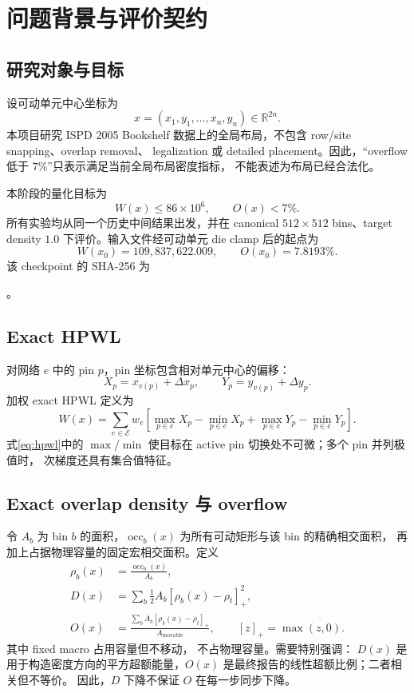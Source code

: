 \documentclass[UTF8,a4paper,11pt]{ctexart}
\DeclareRobustCommand{\code}[1]{\texttt{\detokenize{#1}}}
\newcommand{\R}{\mathbb{R}}
\newcommand{\pos}[1]{\left[#1\right]_{+}}
\begin{document}
\tableofcontents

\section{问题背景与评价契约}

\subsection{研究对象与目标}

设可动单元中心坐标为
\[
  x=(x_1,y_1,\ldots,x_n,y_n)\in\R^{2n}.
\]
本项目研究 ISPD 2005 Bookshelf 数据上的全局布局，不包含 row/site snapping、overlap removal、
legalization 或 detailed placement。因此，“overflow 低于 $7\%$”只表示满足当前全局布局密度指标，
不能表述为布局已经合法化。

本阶段的量化目标为
\[
  W(x)\le 86\times 10^6,
  \qquad O(x)<7\%.
\]
所有实验均从同一个历史中间结果出发，并在 canonical $512\times512$ bins、target density $1.0$
下评价。输入文件经可动单元 die clamp 后的起点为
\[
  W(x_0)=109{,}837{,}622.009,
  \qquad O(x_0)=7.8193\%.
\]
该 checkpoint 的 SHA-256 为
\par\noindent{}。

\subsection{Exact HPWL}

对网络 $e$ 中的 pin $p$，pin 坐标包含相对单元中心的偏移：
\[
  X_p=x_{v(p)}+\Delta x_p,
  \qquad
  Y_p=y_{v(p)}+\Delta y_p.
\]
加权 exact HPWL 定义为
\begin{equation}
  W(x)=\sum_{e\in\mathcal E}w_e
  \left[
  \max_{p\in e}X_p-\min_{p\in e}X_p
  +\max_{p\in e}Y_p-\min_{p\in e}Y_p
  \right].
  \label{eq:hpwl}
\end{equation}
式\eqref{eq:hpwl}中的 $\max/\min$ 使目标在 active pin 切换处不可微；多个 pin 并列极值时，
次梯度还具有集合值特征。

\subsection{Exact overlap density 与 overflow}

令 $A_b$ 为 bin $b$ 的面积，$\operatorname{occ}_b(x)$ 为所有可动矩形与该 bin 的精确相交面积，
再加上占据物理容量的固定宏相交面积。定义
\begin{align}
  \rho_b(x)&=\frac{\operatorname{occ}_b(x)}{A_b},\\
  D(x)&=\sum_b\frac{1}{2}A_b\pos{\rho_b(x)-\rho_t}^{2},
  \label{eq:density-energy}\\
  O(x)&=\frac{\sum_b A_b\pos{\rho_b(x)-\rho_t}}
  {A_{\mathrm{movable}}},
  \qquad \pos{z}=\max(z,0).
  \label{eq:overflow}
\end{align}
其中 fixed macro 占用容量但不移动，\code{terminal_NI} 不占物理容量。需要特别强调：
$D(x)$ 是用于构造密度方向的平方超额能量，$O(x)$ 是最终报告的线性超额比例；二者相关但不等价。
因此，$D$ 下降不保证 $O$ 在每一步同步下降。
\end{document}
